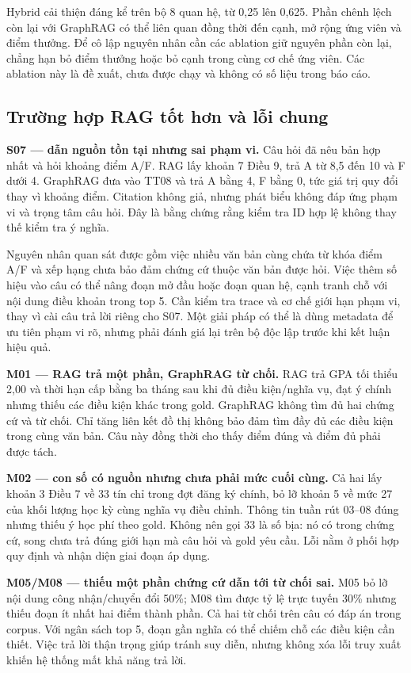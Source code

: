 Hybrid cải thiện đáng kể trên bộ 8 quan hệ, từ 0,25 lên 0,625. Phần chênh lệch còn lại với GraphRAG có thể liên quan đồng thời đến cạnh, mở rộng ứng viên và điểm thưởng. Để cô lập nguyên nhân cần các ablation giữ nguyên phần còn lại, chẳng hạn bỏ điểm thưởng hoặc bỏ cạnh trong cùng cơ chế ứng viên. Các ablation này là đề xuất, chưa được chạy và không có số liệu trong báo cáo.

\subsection{Trường hợp RAG tốt hơn và lỗi chung}
\textbf{S07 --- dẫn nguồn tồn tại nhưng sai phạm vi.} Câu hỏi đã nêu bản hợp nhất và hỏi khoảng điểm A/F. RAG lấy khoản 7 Điều 9, trả A từ 8,5 đến 10 và F dưới 4. GraphRAG đưa vào TT08 và trả A bằng 4, F bằng 0, tức giá trị quy đổi thay vì khoảng điểm. Citation không giả, nhưng phát biểu không đáp ứng phạm vi và trọng tâm câu hỏi. Đây là bằng chứng rằng kiểm tra ID hợp lệ không thay thế kiểm tra ý nghĩa.

Nguyên nhân quan sát được gồm việc nhiều văn bản cùng chứa từ khóa điểm A/F và xếp hạng chưa bảo đảm chứng cứ thuộc văn bản được hỏi. Việc thêm số hiệu vào câu có thể nâng đoạn mở đầu hoặc đoạn quan hệ, cạnh tranh chỗ với nội dung điều khoản trong top 5. Cần kiểm tra trace và cơ chế giới hạn phạm vi, thay vì cài câu trả lời riêng cho S07. Một giải pháp có thể là dùng metadata để ưu tiên phạm vi rõ, nhưng phải đánh giá lại trên bộ độc lập trước khi kết luận hiệu quả.

\textbf{M01 --- RAG trả một phần, GraphRAG từ chối.} RAG trả GPA tối thiểu 2,00 và thời hạn cấp bằng ba tháng sau khi đủ điều kiện/nghĩa vụ, đạt ý chính nhưng thiếu các điều kiện khác trong gold. GraphRAG không tìm đủ hai chứng cứ và từ chối. Chỉ tăng liên kết đồ thị không bảo đảm tìm đầy đủ các điều kiện trong cùng văn bản. Câu này đồng thời cho thấy điểm đúng và điểm đủ phải được tách.

\textbf{M02 --- con số có nguồn nhưng chưa phải mức cuối cùng.} Cả hai lấy khoản 3 Điều 7 về 33 tín chỉ trong đợt đăng ký chính, bỏ lỡ khoản 5 về mức 27 của khối lượng học kỳ cùng nghĩa vụ điều chỉnh. Thông tin tuần rút 03--08 đúng nhưng thiếu ý học phí theo gold. Không nên gọi 33 là số bịa: nó có trong chứng cứ, song chưa trả đúng giới hạn mà câu hỏi và gold yêu cầu. Lỗi nằm ở phối hợp quy định và nhận diện giai đoạn áp dụng.

\textbf{M05/M08 --- thiếu một phần chứng cứ dẫn tới từ chối sai.} M05 bỏ lỡ nội dung công nhận/chuyển đổi 50\%; M08 tìm được tỷ lệ trực tuyến 30\% nhưng thiếu đoạn ít nhất hai điểm thành phần. Cả hai từ chối trên câu có đáp án trong corpus. Với ngân sách top 5, đoạn gần nghĩa có thể chiếm chỗ các điều kiện cần thiết. Việc trả lời thận trọng giúp tránh suy diễn, nhưng không xóa lỗi truy xuất khiến hệ thống mất khả năng trả lời.


